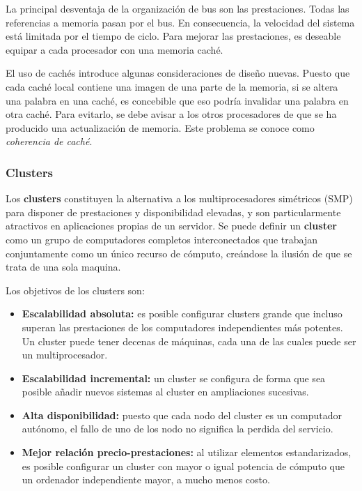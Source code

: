 La principal desventaja de la organización de bus son las prestaciones. Todas las referencias a memoria pasan por el bus. En consecuencia, la velocidad del sistema está limitada por el tiempo de ciclo. Para mejorar las prestaciones, es deseable equipar a cada procesador con una memoria caché.

El uso de cachés introduce algunas consideraciones de diseño nuevas. Puesto que cada caché local contiene una imagen de una parte de la memoria, si se altera una palabra en una caché, es concebible que eso podría invalidar una palabra en otra caché. Para evitarlo, se debe avisar a los otros procesadores de que se ha producido una actualización de memoria. Este problema se conoce como \textit{coherencia de caché}.

\subsubsection{Clusters}

Los \textbf{clusters} constituyen la alternativa a los multiprocesadores simétricos (SMP) para disponer de prestaciones y disponibilidad elevadas, y son particularmente atractivos en aplicaciones propias de un servidor. Se puede definir un \textbf{cluster} como un grupo de computadores completos interconectados que trabajan conjuntamente como un único recurso de cómputo, creándose la ilusión de que se trata de una sola maquina.

Los objetivos de los clusters son:

\begin{itemize}
  \item \textbf{Escalabilidad absoluta:} es posible configurar clusters grande que incluso superan las prestaciones de los computadores independientes más potentes. Un cluster puede tener decenas de máquinas, cada una de las cuales puede ser un multiprocesador.
  \item \textbf{Escalabilidad incremental:} un cluster se configura de forma que sea posible añadir nuevos sistemas al cluster en ampliaciones sucesivas.
  \item \textbf{Alta disponibilidad:} puesto que cada nodo del cluster es un computador autónomo, el fallo de uno de los nodo no significa la perdida del servicio.
  \item \textbf{Mejor relación precio-prestaciones:} al utilizar elementos estandarizados, es posible configurar un cluster con mayor o igual potencia de cómputo que un ordenador independiente mayor, a mucho menos costo.
\end{itemize}

